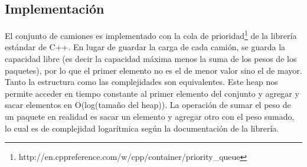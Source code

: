\subsection{Implementaci\'on}
\par{El conjunto de camiones es implementado con la cola de prioridad\footnote{http://en.cppreference.com/w/cpp/container/priority\_queue} de la librer\'ia est\'andar de C++. En lugar de guardar la carga de cada cami\'on, se guarda la capacidad libre (es decir la capacidad m\'axima menos la suma de los pesos de los paquetes), por lo que el primer elemento no es el de menor valor sino el de mayor. Tanto la estructura como las complejidades son equivalentes. Este heap nos permite acceder en tiempo constante al primer elemento del conjunto y agregar y sacar elementos en O(log(tamaño del heap)). La operación de sumar el peso de un paquete en realidad es sacar un elemento y agregar otro con el peso sumado, lo cual es de complejidad logarítmica seg\'un la documentaci\'on de la librer\'ia.}

